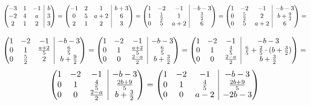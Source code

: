 \documentclass{article}
\makeatletter
\newenvironment{amatrix}[1]{\left(\begin{array}{@{}*{#1}{c}|c@{}}}{\end{array}\right)}
\makeatother
\begin{document}
\begin{equation*}
  \begin{amatrix}{3}
    -3 & 1 & -1 & b \\
    -2 & 4 & a  & 3 \\
    2 & 1 & 2 & 3
  \end{amatrix} = 
  \begin{amatrix}{3}
    -1 & 2 & 1 & b + 3 \\
    0 & 5 & a + 2  & 6 \\
     2 & 1 & 2  & 3
   \end{amatrix} =
   \begin{amatrix}{3}
    1 & -2 & -1 & -b-3 \\
    1 & \frac{1}{2} & 1  & \frac{3}{2} \\
    0 & 5 & a + 2  & 6
  \end{amatrix} =
  \begin{amatrix}{3}
    1 & -2 & -1 & -b-3 \\
    0 & \frac{5}{2} & 2  & b + \frac{9}{2} \\
    0 & 5 & a + 2  & 6
  \end{amatrix} =
\end{equation*}

\begin{equation*}
  \begin{amatrix}{3}
    1 & -2 & -1 & -b-3 \\
    0 & 1 & \frac{a+2}{5}  & \frac{6}{5} \\
    0 & \frac{5}{2} & 2  & b + \frac{9}{2}
  \end{amatrix} =
  \begin{amatrix}{3}
    1 & -2 & -1 & -b-3 \\
    0 & 1 & \frac{a+2}{5}  & \frac{6}{5} \\
    0 & 0 & \frac{2-a}{2}& b + \frac{3}{2}
  \end{amatrix} =
  \begin{amatrix}{3}
    1 & -2 & -1 & -b-3 \\
    0 & 1 & \frac{4}{5}  & \frac{6}{5} + \frac{2}{5} \cdot (b + \frac{3}{2}) \\
    0 & 0 & \frac{2-a}{2}& b + \frac{3}{2}
  \end{amatrix} =
\end{equation*}
\begin{equation*}
  \begin{amatrix}{3}
    1 & -2 & -1 & -b-3 \\
    0 & 1 & \frac{4}{5}  & \frac{2b + 9}{5} \\
    0 & 0 & \frac{2-a}{2}& b + \frac{3}{2}
  \end{amatrix} = 
  \begin{amatrix}{3}
    1 & -2 & -1 & -b-3 \\
    0 & 1 & \frac{4}{5}  & \frac{2b + 9}{5} \\
    0 & 0 & a - 2& - 2b - 3
  \end{amatrix}
\end{equation*}
\end{document}
